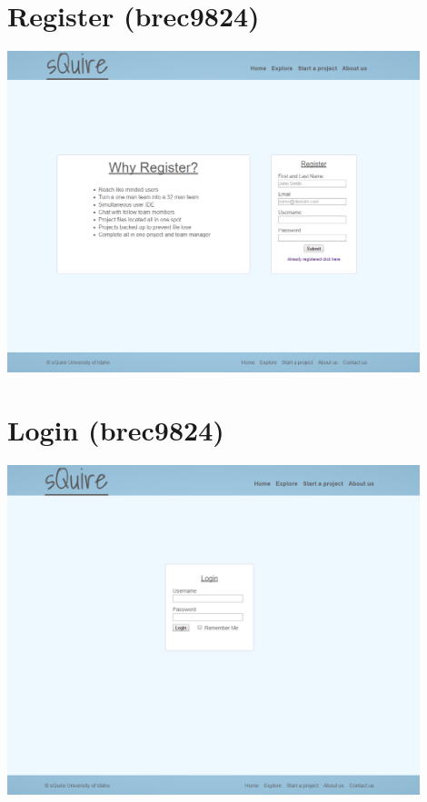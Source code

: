 \documentclass[11pt]{report}
\begin{document}
    \section{Register (brec9824)}
    \begin{minipage}{1\textwidth}
        \begin{center}
            \includegraphics[width=0.9\textwidth]{mockups/mockup-register-brec9824}
        \end{center}
    \end{minipage}
    
     \section{Login (brec9824)}
    \begin{minipage}{1\textwidth}
        \begin{center}
            \includegraphics[width=0.9\textwidth]{mockups/mockup-login-brec9824}
        \end{center}
    \end{minipage}
    
\end{document}

